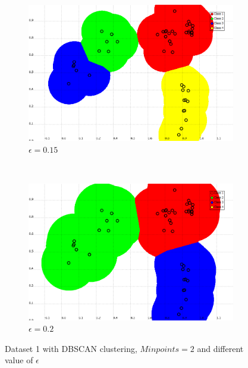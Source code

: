 \documentclass[a4paper,10pt]{article}
\begin{document}
\begin{figure}[H]
\begin{subfigure}[t]{0.2\textwidth}
      \includegraphics[width=\textwidth]{pictures/DBSCAN-Minpoint-2-epsilon015}
      \caption{$\epsilon = 0.15$}
      \label{fig:DBSCAN-Minpoint-2-epsilon15}
     \end{subfigure}
      ~
    \begin{subfigure}[t]{0.2\textwidth}
      \centering
      \includegraphics[width=\textwidth]{pictures/DBSCAN-Minpoint-2-epsilon02}
      \caption{$\epsilon = 0.2$}
      \label{fig:DBSCAN-Minpoint-2-epsilon02}
     \end{subfigure}
     \caption{Dataset 1 with DBSCAN clustering, $Minpoints = 2 $ and different value of $\epsilon$}
     \label{fig:DBScan_varyeps}
\end{figure}


\end{document}
